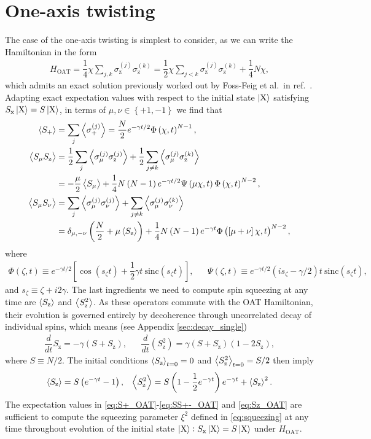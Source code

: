 \documentclass[aps,notitlepage,nofootinbib,11pt]{revtex4-1}
\renewcommand{\t}{\text} %
\newcommand{\f}[2]{\dfrac{#1}{#2}} %
\newcommand{\p}[1]{\left(#1\right)} %
\renewcommand{\sp}[1]{\left[#1\right]} %
\renewcommand{\set}[1]{\left\{#1\right\}} %
\newcommand{\bk}{\Braket} %
\newcommand{\z}{\text{z}}
\newcommand{\x}{\text{x}}
\newcommand{\X}{\text{X}}
\newcommand{\1}{\mathds{1}}
\begin{document}
\section{One-axis twisting}

The case of the one-axis twisting is simplest to consider, as we can
write the Hamiltonian in the form
\begin{align}
  H_{\t{OAT}} = \f14 \chi \sum_{j,k} \sigma_\z^{(j)} \sigma_\z^{(k)}
  = \f12 \chi \sum_{j<k} \sigma_\z^{(j)} \sigma_\z^{(k)} + \f14 N \chi,
\end{align}
which admits an exact solution previously worked out by Foss-Feig et
al.~in ref.~\cite{foss-feig2013nonequilibrium}.  Adapting exact
expectation values with respect to the initial state $\ket{\X}$
satisfying $S_\x\ket{\X}=S\ket{\X}$, in terms of
$\mu,\nu\in\set{+1,-1}$ we find that
\begin{align}
  \bk{S_+}
  &= \sum_j\bk{\sigma_+^{(j)}}
  = \f{N}{2} e^{-\gamma t/2} \Phi\p{\chi,t}^{N-1}, \label{eq:S+_OAT} \\
  \bk{S_\mu S_\z}
  &= \f12\sum_j\bk{\sigma_\mu^{(j)}\sigma_\z^{(j)}}
  + \f12\sum_{j\ne k} \bk{\sigma_\mu^{(j)} \sigma_\z^{(k)}} \\
  &= -\f{\mu}{2}\bk{S_\mu} + \f14 N \p{N-1} e^{-\gamma t/2}
  \Psi\p{\mu\chi,t} \Phi\p{\chi,t}^{N-2}, \\
  \bk{S_\mu S_\nu}
  &= \sum_j \bk{\sigma_\mu^{(j)} \sigma_\nu^{(j)}}
  + \sum_{j\ne k} \bk{\sigma_\mu^{(j)} \sigma_\nu^{(k)}} \\
  &= \delta_{\mu,-\nu} \p{\f{N}{2} + \mu \bk{S_\z}}
  + \f14 N \p{N-1} e^{-\gamma t}
  \Phi\p{\sp{\mu+\nu}\chi,t}^{N-2}, \label{eq:SS+-_OAT}
\end{align}
where
\begin{align}
  \Phi\p{\zeta,t} \equiv e^{-\gamma t/2}
  \sp{\cos\p{s_\zeta t}+\f12\gamma t~\t{sinc}\p{s_\zeta t}},
  &&
  \Psi\p{\zeta,t} \equiv e^{-\gamma t/2}
  \p{is_\zeta-\gamma/2}t~ \t{sinc}\p{s_\zeta t},
\end{align}
and $s_\zeta \equiv \zeta + i2\gamma$.  The last ingredients we need
to compute spin squeezing at any time are $\bk{S_\z}$ and
$\bk{S_\z^2}$.  As these operators commute with the OAT Hamiltonian,
their evolution is governed entirely by decoherence through
uncorrelated decay of individual spins, which means (see Appendix
\ref{sec:decay_single})
\begin{align}
  \f{d}{dt} S_\z = -\gamma \p{S + S_\z},
  &&
  \f{d}{dt}\p{S_\z^2} = \gamma \p{S + S_\z} \p{1 - 2S_\z},
\end{align}
where $S\equiv N/2$.  The initial conditions $\bk{S_\z}_{t=0}=0$ and
$\bk{S_\z^2}_{t=0}=S/2$ then imply
\begin{align}
  \bk{S_\z} = S\p{e^{-\gamma t}-1},
  &&
  \bk{S_\z^2} = S \p{1 - \f12 e^{-\gamma t}} e^{-\gamma t} + \bk{S_\z}^2.
  \label{eq:Sz_OAT}
\end{align}
The expectation values in \eqref{eq:S+_OAT}-\eqref{eq:SS+-_OAT} and
\eqref{eq:Sz_OAT} are sufficient to compute the squeezing parameter
$\xi^2$ defined in \eqref{eq:squeezing} at any time throughout
evolution of the initial state $\ket{\X}:S_\x\ket{\X}=S\ket{\X}$ under
$H_{\t{OAT}}$.
\end{document}
